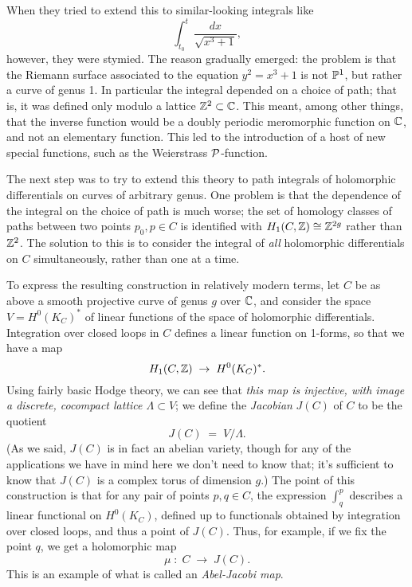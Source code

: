 When they tried to extend this to similar-looking integrals like
$$
\int_{t_0}^t \frac{dx}{\sqrt{x^3+1}},
$$
however, they were stymied. The reason gradually emerged: the problem is that the Riemann surface associated to the equation $y^2 = x^3+1$ is not $\PP^1$, but rather a curve of genus 1. In particular  the integral depended on a choice of path; that is, it was defined only modulo a lattice $\ZZ^2 \subset \CC$. This meant, among other things, that the inverse function would be a doubly periodic meromorphic function on $\CC$, and not an elementary function. This led to the introduction of a host of new special functions, such as the Weierstrass $\sP$-function.

The next step was to try to extend this theory to path integrals of holomorphic differentials on curves of arbitrary genus. One problem is that the dependence of the integral on the choice of path is much worse; the set of homology classes of paths between two points $p_0, p \in C$ is identified with $H_1(C,\ZZ) \cong \ZZ^{2g}$ rather than $\ZZ^2$. The solution to this is to consider the integral of \emph{all} holomorphic differentials on $C$ simultaneously, rather than one at a time.

To express the resulting construction in relatively modern terms, let $C$ be as above a smooth projective curve of genus $g$ over $\CC$, and consider the space $V = H^0(K_C)^*$ of linear functions of the space of holomorphic differentials. Integration over closed loops in $C$ defines a linear function on 1-forms, so that we have a map
$$
H_1(C,\ZZ) \; \to \;  H^0(K_C)^*.
$$
Using fairly basic Hodge theory, we can see that \emph{this map is injective, with image a discrete, cocompact lattice $\Lambda \subset V$}; we define the \emph{Jacobian} $J(C)$ of $C$ to be the quotient
$$
J(C) \; = \; V/\Lambda.
$$
(As we said, $J(C)$ is in fact an abelian variety, though for any of the applications we have in mind here we don't need to know that; it's sufficient to know that $J(C)$ is a complex torus of dimension $g$.) The point of this construction is that for any pair of points $p, q \in C$, the expression $\int_q^p$ describes a linear functional on $H^0(K_C)$, defined up to functionals obtained by integration over closed loops, and thus a point of $J(C)$. Thus, for example, if we fix the point $q$, we get a holomorphic map
$$
\mu \; : \; C \; \to \; J(C).
$$
This is an example of what is called an \emph{Abel-Jacobi map}.

